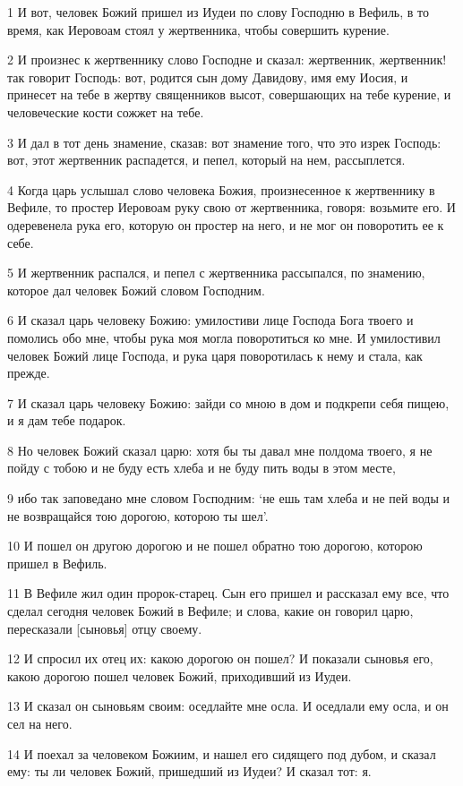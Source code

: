 \par 1 И вот, человек Божий пришел из Иудеи по слову Господню в Вефиль, в то время, как Иеровоам стоял у жертвенника, чтобы совершить курение.
\par 2 И произнес к жертвеннику слово Господне и сказал: жертвенник, жертвенник! так говорит Господь: вот, родится сын дому Давидову, имя ему Иосия, и принесет на тебе в жертву священников высот, совершающих на тебе курение, и человеческие кости сожжет на тебе.
\par 3 И дал в тот день знамение, сказав: вот знамение того, что это изрек Господь: вот, этот жертвенник распадется, и пепел, который на нем, рассыплется.
\par 4 Когда царь услышал слово человека Божия, произнесенное к жертвеннику в Вефиле, то простер Иеровоам руку свою от жертвенника, говоря: возьмите его. И одеревенела рука его, которую он простер на него, и не мог он поворотить ее к себе.
\par 5 И жертвенник распался, и пепел с жертвенника рассыпался, по знамению, которое дал человек Божий словом Господним.
\par 6 И сказал царь человеку Божию: умилостиви лице Господа Бога твоего и помолись обо мне, чтобы рука моя могла поворотиться ко мне. И умилостивил человек Божий лице Господа, и рука царя поворотилась к нему и стала, как прежде.
\par 7 И сказал царь человеку Божию: зайди со мною в дом и подкрепи себя пищею, и я дам тебе подарок.
\par 8 Но человек Божий сказал царю: хотя бы ты давал мне полдома твоего, я не пойду с тобою и не буду есть хлеба и не буду пить воды в этом месте,
\par 9 ибо так заповедано мне словом Господним: `не ешь там хлеба и не пей воды и не возвращайся тою дорогою, которою ты шел'.
\par 10 И пошел он другою дорогою и не пошел обратно тою дорогою, которою пришел в Вефиль.
\par 11 В Вефиле жил один пророк-старец. Сын его пришел и рассказал ему все, что сделал сегодня человек Божий в Вефиле; и слова, какие он говорил царю, пересказали [сыновья] отцу своему.
\par 12 И спросил их отец их: какою дорогою он пошел? И показали сыновья его, какою дорогою пошел человек Божий, приходивший из Иудеи.
\par 13 И сказал он сыновьям своим: оседлайте мне осла. И оседлали ему осла, и он сел на него.
\par 14 И поехал за человеком Божиим, и нашел его сидящего под дубом, и сказал ему: ты ли человек Божий, пришедший из Иудеи? И сказал тот: я.
